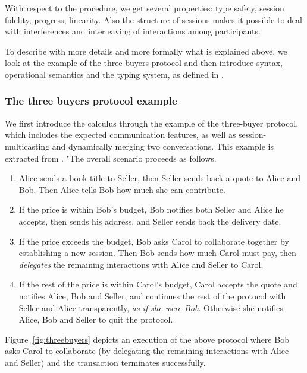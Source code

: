 \documentclass[a4paper,11pt,twoside]{report}
\begin{document}
With respect to the procedure, we get several properties: type safety, session fidelity, progress, linearity. Also the structure of sessions makes it possible to deal with interferences and interleaving of interactions among participants.

To describe with more details and more formally what is explained above, we look at the example of the three buyers protocol and then introduce syntax, operational semantics and the typing system, as defined in \cite{coppoglobal}.


\subsubsection{The three buyers protocol example}
We first introduce the calculus through the example of the three-buyer protocol, which includes the expected communication features, as well as session-multicasting and dynamically merging two conversations. This example is extracted from \cite{coppoglobal}. "The overall scenario  proceeds as follows.
\begin{enumerate}
\item Alice sends a book title to Seller, then Seller sends back a quote to Alice and Bob. Then Alice tells Bob how much she can contribute.
\item If the price is within Bob's budget, Bob notifies both Seller and Alice he accepts, then sends his address, and Seller sends back the delivery date.
\item If the price exceeds the budget, Bob asks Carol to collaborate together by establishing a new session. Then Bob sends how much Carol must pay, then {\em delegates} the remaining interactions with Alice and Seller to Carol.
\item  If the rest of the price is within Carol's budget, Carol accepts the quote and notifies Alice, Bob and Seller, and continues the rest of the protocol with Seller and Alice transparently, {\em as if she were Bob}. Otherwise she notifies Alice, Bob and Seller to quit the protocol.\vspace{-2mm}
\end{enumerate}
Figure~\ref{fig:threebuyers} depicts an execution of the above protocol where Bob asks Carol to collaborate (by delegating the
remaining interactions with Alice and Seller) and the transaction terminates successfully.
\end{document}
